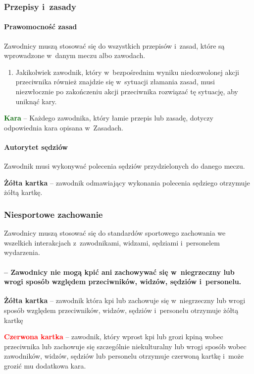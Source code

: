 \documentclass[12pt]{article}
\newcommand\redcard[1]{\bgroup\textcolor{red}{\textbf{#1}}}
\newcommand\yellowcard[1]{\bgroup\textcolor{darkyellow}{\textbf{#1}}}
\newcommand\other[1]{\bgroup\textcolor{darkgreen}{\textbf{#1}}}
\begin{document}
\subsubsection{Przepisy i~zasady}

\paragraph{Prawomocność zasad}
Zawodnicy muszą stosować się do
wszystkich przepisów i~zasad, które są wprowadzone w~danym meczu albo
zawodach.
\begin{enumerate}
	\item Jakikolwiek zawodnik, który w~bezpośrednim wyniku niedozwolonej akcji
	      przeciwnika również znajdzie się w~sytuacji złamania zasad, musi
	      niezwłocznie po zakończeniu akcji przeciwnika rozwiązać tę sytuację, aby
	      uniknąć kary.
\end{enumerate}

\other{Kara} -- Każdego zawodnika, który łamie przepis lub zasadę, dotyczy
odpowiednia kara opisana w~Zasadach.

\paragraph{Autorytet sędziów}
Zawodnik musi wykonywać polecenia
sędziów przydzielonych do danego meczu.

\yellowcard{Żółta kartka} -- zawodnik odmawiający wykonania polecenia sędziego
otrzymuje żółtą kartkę.

\subsubsection{Niesportowe zachowanie}

Zawodnicy muszą stosować się do standardów sportowego zachowania we
wszelkich interakcjach z~zawodnikami, widzami, sędziami i~personelem
wydarzenia.

\paragraph{-- Zawodnicy nie mogą kpić ani zachowywać się w~niegrzeczny lub wrogi sposób względem przeciwników, widzów, sędziów i~personelu.}

\yellowcard{Żółta kartka} -- zawodnik która kpi lub zachowuje się w~niegrzeczny
lub wrogi sposób względem przeciwników, widzów, sędziów i~personelu
otrzymuje żółtą kartkę

\redcard{Czerwona kartka} -- zawodnik, który wprost kpi lub grozi kpiną
wobec przeciwnika lub zachowuje się szczególnie niekulturalny lub wrogi
sposób wobec zawodników, widzów, sędziów lub personelu otrzymuje
czerwoną kartkę i~może grozić mu dodatkowa kara.
\end{document}
